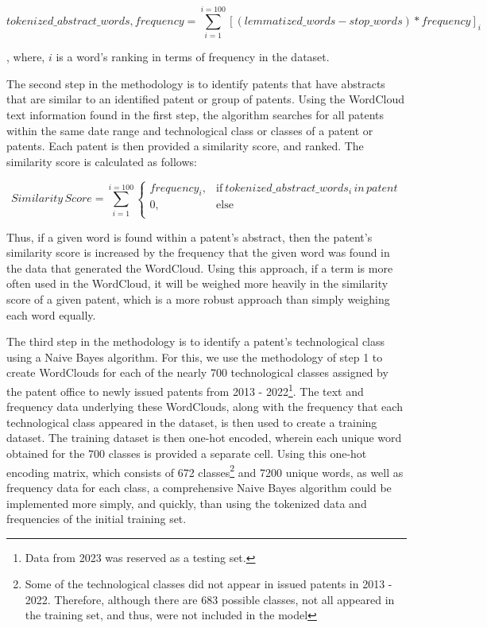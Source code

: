 \documentclass{article}
\begin{document}
\begin{equation}
tokenized\_abstract\_words, frequency = \sum_{i=1}^{i=100} [(lemmatized\_words - stop\_words) * frequency]_i
\end{equation}

, where, \begin{math}i\end{math} is a word’s ranking in terms of frequency in the dataset.

The second step in the methodology is to identify patents that have abstracts that are similar to an identified patent or group of patents.  Using the WordCloud text information found in the first step, the algorithm searches for all patents within the same date range and technological class or classes of a patent or patents.  Each patent is then provided a similarity score, and ranked.  The similarity score is calculated as follows:

\begin{equation}
  Similarity\, Score = \sum_{i=1}^{i=100}
    \begin{cases}
      frequency_i, & \text{if}\ tokenized\_abstract\_words_i\, in\, patent \\
      0, & \text{else} \\
    \end{cases}
\end{equation}

Thus, if a given word is found within a patent’s abstract, then the patent’s similarity score is increased by the frequency that the given word was found in the data that generated the WordCloud.  Using this approach, if a term is more often used in the WordCloud, it will be weighed more heavily in the similarity score of a given patent, which is a more robust approach than simply weighing each word equally.

The third step in the methodology is to identify a patent’s technological class using a Naive Bayes algorithm.  For this, we use the methodology of step 1 to create WordClouds for each of the nearly 700 technological classes assigned by the patent office to newly issued patents from 2013 - 2022\footnote{Data from 2023 was reserved as a testing set.}.  The text and frequency data underlying these WordClouds, along with the frequency that each technological class appeared in the dataset, is then used to create a training dataset.  The training dataset is then one-hot encoded, wherein each unique word obtained for the 700 classes is provided a separate cell.  Using this one-hot encoding matrix, which consists of 672 classes\footnote{Some of the technological classes did not appear in issued patents in 2013 - 2022.  Therefore, although there are 683 possible classes, not all appeared in the training set, and thus, were not included in the model} and 7200 unique words, as well as frequency data for each class, a comprehensive Naive Bayes algorithm could be implemented more simply, and quickly, than using the tokenized data and frequencies of the initial training set.
\end{document}
